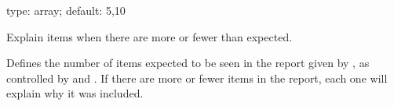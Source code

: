\documentclass[letterpaper,10pt,english]{sphinxmanual}
\begin{document}

\begin{fulllineitems}
\label{\detokenize{mariadb-query-digest:cmdoption-mariadb-query-digest-expected-range}}
type: array; default: 5,10

Explain items when there are more or fewer than expected.

Defines the number of items expected to be seen in the report given by
, as controlled by {\hyperref[\detokenize{mariadb-query-digest:cmdoption-mariadb-query-digest-limit}]{}} and {\hyperref[\detokenize{mariadb-query-digest:cmdoption-mariadb-query-digest-outliers}]{}}.  If
there  are more or fewer items in the report, each one will explain why it was
included.

\end{fulllineitems}

\end{document}

